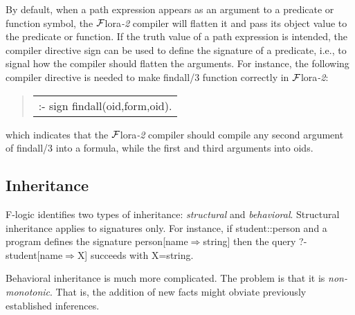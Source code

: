 \documentclass[11pt]{article}
\newenvironment{qrules}{\begin{quote}\sf\begin{tabular}[t]{l}}%
{\end{tabular}\end{quote}}
\newcommand{\Fd}{\ensuremath{{\Rightarrow}}}                      %
\newcommand{\FLORA}{{\mbox{${\cal F}${\sc lora}\rm\emph{-2}}}\xspace}
\newcommand{\fl}{\mbox{F-logic}\xspace}
\begin{document}
%
By default, when a path expression appears as an argument to a
predicate or function symbol, the \FLORA compiler will flatten it and
pass its object value to the predicate or function. If the truth value
of a path expression is intended, the compiler directive {\sf sign}
can be used to define the signature of a predicate, i.e., to signal
how the compiler should flatten the arguments. For instance, the
following compiler directive is needed to make {\sf findall/3}
function correctly in \FLORA:
\begin{qrules}
:- sign findall(oid,form,oid).
\end{qrules}
which indicates that the \FLORA compiler should compile
any second argument of {\sf findall/3} into a formula, while the
first and third arguments into oids.



\subsection{Inheritance}


\fl identifies two types of inheritance: \emph{structural} and
\emph{behavioral}.  Structural inheritance applies to signatures only. For
instance, if {\sf student::person} and a program defines the signature
{\sf person[name{\Fd}string]} then the query {\sf ?- student[name{\Fd}X]}
succeeds with {\sf X=string}.

Behavioral inheritance is much more complicated. The problem  is that it is
\emph{non-monotonic}. That is, the addition of new facts might obviate previously
established inferences.
\end{document}
